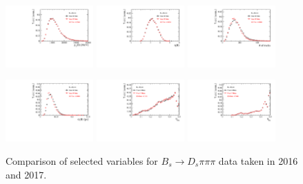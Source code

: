 \begin{figure}[h]
\centering
\includegraphics[height=!,width=0.3\textwidth]{figs/dataVsMC/year16vs17_norm/Ds2all_Bs_PT.pdf}
\includegraphics[height=!,width=0.3\textwidth]{figs/dataVsMC/year16vs17_norm/Ds2all_Bs_ETA.pdf}
\includegraphics[height=!,width=0.3\textwidth]{figs/dataVsMC/year16vs17_norm/Ds2all_NTracks.pdf}


\includegraphics[height=!,width=0.3\textwidth]{figs/dataVsMC/year16vs17_norm/Ds2all_Bs_DTF_TAUERR.pdf}
\includegraphics[height=!,width=0.3\textwidth]{figs/dataVsMC/year16vs17_norm/Ds2all_OS_Combination_PROB.pdf}
\includegraphics[height=!,width=0.3\textwidth]{figs/dataVsMC/year16vs17_norm/Ds2all_SS_Kaon_PROB.pdf}

\caption{Comparison of selected variables for $B_s \to D_s \pi \pi \pi$ data taken in 2016 and 2017.}
\label{fig:}
\end{figure}

